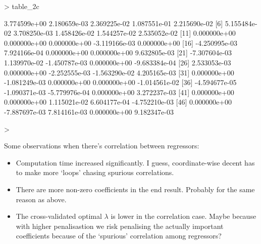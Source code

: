 \documentclass[a4paper,12pt,twoside]{article}
\begin{document}
\begin{Schunk}
\begin{Sinput}
> table_2c
\end{Sinput}
\begin{Soutput}
 [1]  3.774599e+00  2.180659e-03  2.369225e-02  1.087551e-01  2.215690e-02
 [6]  5.155484e-02  3.708250e-03  1.458426e-02  1.544257e-02  2.535052e-02
[11]  0.000000e+00  0.000000e+00  0.000000e+00 -3.119166e-03  0.000000e+00
[16] -4.250995e-03  7.924166e-04  0.000000e+00  0.000000e+00  9.632805e-03
[21] -7.307604e-03  1.139970e-02 -1.450787e-03  0.000000e+00 -9.683384e-04
[26]  2.533053e-03  0.000000e+00 -2.252555e-03 -1.563290e-02  4.205165e-03
[31]  0.000000e+00 -1.081249e-03  0.000000e+00  0.000000e+00 -1.014561e-02
[36] -4.594677e-05 -1.090371e-03 -5.779976e-04  0.000000e+00  3.272237e-03
[41]  0.000000e+00  0.000000e+00  1.115021e-02  6.604177e-04 -4.752210e-03
[46]  0.000000e+00 -7.887697e-03  7.814161e-03  0.000000e+00  9.182347e-03
\end{Soutput}
\begin{Sinput}
> 
\end{Sinput}
\end{Schunk}


Some observations when there's correlation between regressors:

\begin{itemize}
  \item Computation time increased significantly. I guess, coordinate-wise decent has to make more `loops' chasing spurious correlations.
  \item There are more non-zero coefficients in the end result. Probably for the same reason as above.
  \item The cross-validated optimal $\lambda$ is lower in the correlation case. Maybe because with higher penalisastion we risk penalising the actually important coefficients because of the `spurious' correlation among regressors?
\end{itemize}
\end{document}
